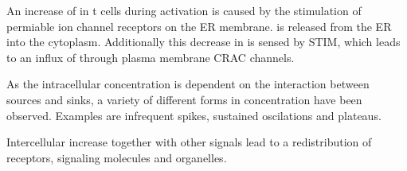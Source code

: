 An increase of \Calcium in t cells during activation is caused by the stimulation of \Calcium permiable ion channel receptors on the ER membrane. \Calcium is released from the ER into the cytoplasm. Additionally this decrease in \Calcium is sensed by STIM, which leads to an influx of \Calcium through plasma membrane CRAC channels.\cite{smith2009}

As the intracellular \Calcium concentration is dependent on the interaction between \Calcium sources and sinks, a variety of different forms in \Calcium concentration have been observed. Examples are infrequent spikes, sustained oscilations and plateaus.\cite{Lewis2001}

Intercellular \Calcium increase together with other signals lead to a redistribution of receptors, signaling molecules and organelles.\cite{joseph2014}
